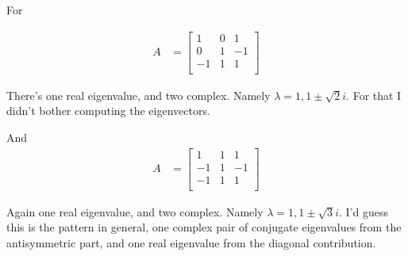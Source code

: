 For 

\begin{align*}
A &= 
\begin{bmatrix}
1 & 0 & 1 \\
0 & 1 & -1 \\
-1 & 1 & 1  \\
\end{bmatrix} 
\end{align*}

There's one real eigenvalue, and two complex.  Namely $\lambda = 1, 1 \pm \sqrt{2} i$.  For that I didn't bother computing the eigenvectors.

And
\begin{align*}
A &= 
\begin{bmatrix}
1 & 1 & 1 \\
-1 & 1 & -1 \\
-1 & 1 & 1  \\
\end{bmatrix} 
\end{align*}

Again one real eigenvalue, and two complex.  Namely $\lambda = 1, 1 \pm \sqrt{3} i$.  I'd guess this is the pattern in general, one complex pair of conjugate eigenvalues from the antisymmetric part, and one real eigenvalue from the diagonal contribution.

\EndArticle
